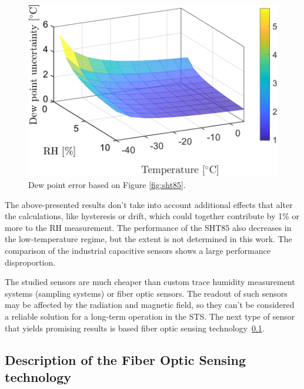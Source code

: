 \begin{figure}[!h]
\centering
\includegraphics[width=0.6\columnwidth]{Chapter5/images/SHTRH15T02.png}
\caption{Dew point error based on Figure \ref{fig:sht85}.}
\label{fig:sht85_dp}
\end{figure}
\newpage
The above-presented results don't take into account additional effects that alter the calculations, like hysteresis or drift, which could together contribute by 1\% or more to the \gls{RH} measurement. The performance of the SHT85 also decreases in the low-temperature regime, but the extent is not determined in this work. The comparison of the industrial capacitive sensors shows a large performance disproportion.

The studied sensors are much cheaper than custom trace humidity measurement systems (sampling systems) or fiber optic sensors. The readout of such sensors may be affected by the radiation and magnetic field, so they can't be considered a reliable solution for a long-term operation in the \gls{STS}. The next type of sensor that yields promising results is based fiber optic sensing technology~\ref{FOS}.

\subsection{Description of the Fiber Optic Sensing technology}
\label{FOS}

